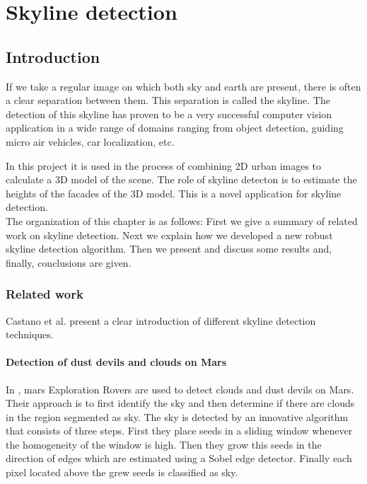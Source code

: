 
\section{Skyline detection}
\label{sec:skylinedetection}
 \subsection{Introduction}
If we take a regular image on which both sky and earth are present, there
is often a clear separation between them. This separation is called the
skyline. %
The detection of this skyline has proven to be a very successful computer vision
application in a wide range of domains ranging from object detection, 
guiding micro air vehicles, car localization, etc. 

In this project it is used in the process of combining 2D urban images to
calculate a 3D model of the scene.  The role of skyline detecton is to estimate
the heights of the facades of the 3D model.  This is a novel application for
skyline detection.\\

The organization of this chapter is as follows:  First we give a summary of
related work on skyline detection.  Next we explain how we developed a new
robust skyline detection algorithm.  Then we present and discuss some results
and, finally, conclusions are given.

\subsubsection{Related work}
Castano et al. \cite{Dust} present a clear introduction of different skyline
detection techniques. 

\paragraph{Detection of dust devils and clouds on Mars}
In \cite{Dust}, mars Exploration Rovers are used to detect clouds and dust devils on Mars.
Their approach is to first identify the sky and then determine if there are
clouds in the region segmented as sky. The sky is detected by an innovative
algorithm that consists of three steps.  First they place seeds in a sliding
window whenever the homogeneity of the window is high. Then they grow this seeds
in the direction of edges which are estimated using a Sobel edge detector.
Finally each pixel located above the grew seeds is classified as sky.\\

